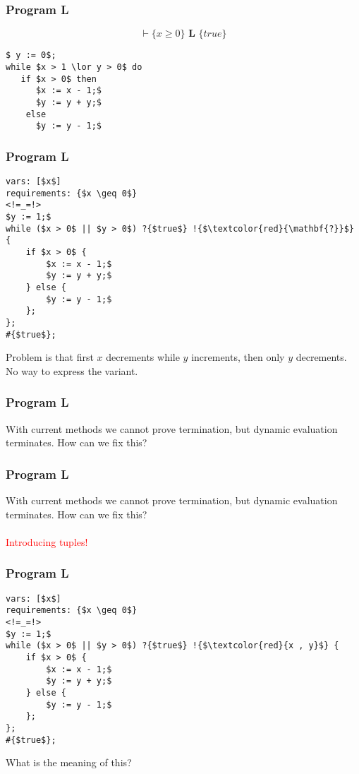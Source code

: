 \begin{frame}[containsverbatim]
  \frametitle{Program L}
  $$\vdash \{x \geq 0\} \textbf{ L } \{ true \}$$
\begin{lstlisting}[mathescape=true]
$ y := 0$;
while $x > 1 \lor y > 0$ do
   if $x > 0$ then
      $x := x - 1;$
      $y := y + y;$
    else
      $y := y - 1;$
\end{lstlisting}
\end{frame}

\begin{frame}[containsverbatim]
  \frametitle{Program L}
\begin{lstlisting}[mathescape=true]
vars: [$x$]
requirements: {$x \geq 0$}
<!=_=!>
$y := 1;$
while ($x > 0$ || $y > 0$) ?{$true$} !{$\textcolor{red}{\mathbf{?}}$} {
    if $x > 0$ {
        $x := x - 1;$
        $y := y + y;$
    } else {
        $y := y - 1;$
    };
};
#{$true$};
\end{lstlisting}
Problem is that first $x$ decrements while $y$ increments, then only $y$ decrements.\\
No way to express the variant.
\end{frame}

\begin{frame}[containsverbatim]
  \frametitle{Program L}
  With current methods we cannot prove termination, but dynamic evaluation terminates.
  How can we fix this?
\end{frame}

\begin{frame}[containsverbatim]
  \frametitle{Program L}
  With current methods we cannot prove termination, but dynamic evaluation terminates.
  How can we fix this?
  \\~\\
  \textcolor{red}{Introducing tuples!}
\end{frame}

\begin{frame}[containsverbatim]
  \frametitle{Program L}
\begin{lstlisting}[mathescape=true]
vars: [$x$]
requirements: {$x \geq 0$}
<!=_=!>
$y := 1;$
while ($x > 0$ || $y > 0$) ?{$true$} !{$\textcolor{red}{x , y}$} {
    if $x > 0$ {
        $x := x - 1;$
        $y := y + y;$
    } else {
        $y := y - 1;$
    };
};
#{$true$};
\end{lstlisting}
What is the meaning of this?
\end{frame}

